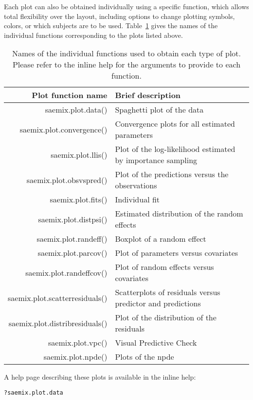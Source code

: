 \bigskip Each plot can also be obtained individually using a specific function, which allows total flexibility over the layout, including options to change plotting symbols, colors, or which subjects are to be used. Table~\ref{tab:plot.functions} gives the names of the individual functions corresponding to the plots listed above.
 \begin{table}[!h]
\begin{center}
\begin{tabular}{r p{10cm}}
\hline Plot function name & Brief description\\
\hline
{\sf saemix.plot.data()} & Spaghetti plot of the data \\
{\sf saemix.plot.convergence()} & Convergence plots for all estimated parameters \\
{\sf saemix.plot.llis()} & Plot of the log-likelihood estimated by importance sampling \\
{\sf saemix.plot.obsvspred()} & Plot of the predictions versus the observations \\
{\sf saemix.plot.fits()} & Individual fit \\
{\sf saemix.plot.distpsi()} & Estimated distribution of the random effects \\
{\sf saemix.plot.randeff()} & Boxplot of a random effect \\
{\sf saemix.plot.parcov()} & Plot of parameters versus covariates \\
{\sf saemix.plot.randeffcov()} & Plot of random effects versus covariates \\
{\sf saemix.plot.scatterresiduals()} & Scatterplots of residuals versus predictor and predictions \\
{\sf saemix.plot.distribresiduals()} & Plot of the distribution of the residuals \\
{\sf saemix.plot.vpc()} & Visual Predictive Check \\
{\sf saemix.plot.npde()} & Plots of the npde \\
\hline
\end{tabular}
\caption{Names of the individual functions used to obtain each type of plot. Please refer to the inline help for the arguments to provide to each function.} \label{tab:plot.functions}
\end{center}
\par \kern -0.5cm
\end{table} 

A help page describing these plots is available in the inline help:
\begin{verbatim}
?saemix.plot.data
\end{verbatim}

